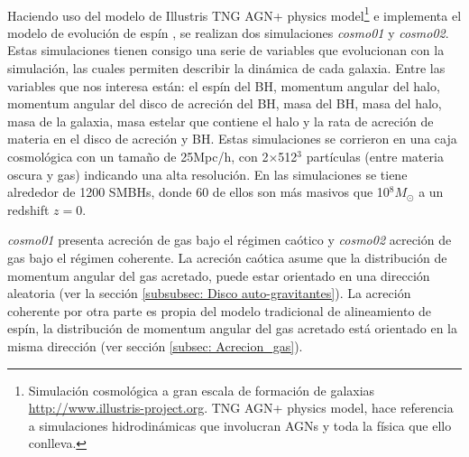 ~\\

Haciendo uso del modelo de Illustris TNG AGN+ physics model\footnote{Simulación cosmológica a gran escala de formación de galaxias \url{http://www.illustris-project.org}. TNG AGN+ physics model, hace referencia a simulaciones hidrodinámicas que involucran AGNs y toda la física que ello conlleva.} e implementa el modelo de evolución de espín \cite{Bustamante2018b}, se realizan dos simulaciones {\it{cosmo01}} y {\it{cosmo02}}. Estas simulaciones tienen consigo una serie de variables que evolucionan con la simulación, las cuales permiten describir la dinámica de cada galaxia.
Entre las variables que nos interesa están: el espín del BH, momentum angular del halo, momentum angular del disco de acreción del BH, masa del BH, masa del halo, masa de la galaxia, masa estelar que contiene el halo y la rata de acreción de materia en el disco de acreción y BH. Estas simulaciones se corrieron en una caja cosmológica con un tamaño de 25Mpc/h, con 2$\times$512$^{3}$ partículas (entre materia oscura y gas) indicando una alta resolución. En las simulaciones se tiene alrededor de 1200 SMBHs, donde 60 de ellos son más masivos que 10$^{8}M_{\odot}$ a un redshift $z=0$.

{\it{cosmo01}} presenta acreción de gas bajo el régimen caótico y {\it{cosmo02}} acreción de gas bajo el régimen coherente. La acreción caótica asume que la distribución de momentum angular del gas acretado, puede estar orientado en una dirección aleatoria  
(ver la sección \ref{subsubsec: Disco auto-gravitantes}). La acreción coherente por otra parte es propia del modelo tradicional de alineamiento de espín, la distribución de momentum angular del gas acretado está orientado en la misma dirección
(ver sección \ref{subsec: Acrecion_gas}).











